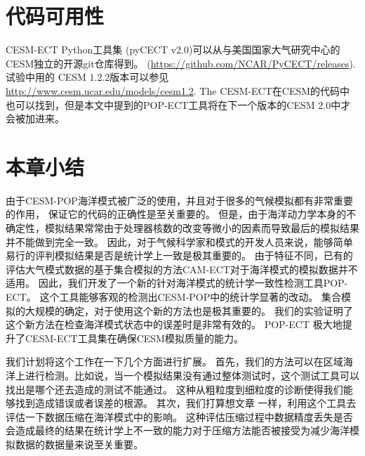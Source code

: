 \section{代码可用性}\label{verify:code}

CESM-ECT Python工具集 (pyCECT v2.0)可以从与美国国家大气研究中心的CESM独立的开源git仓库得到。 (\url{https://github.com/NCAR/PyCECT/releases}).  试验中用的 CESM 1.2.2版本可以参见\url{http://www.cesm.ucar.edu/models/cesm1.2}. The CESM-ECT在CESM的代码中也可以找到，但是本文中提到的POP-ECT工具将在下一个版本的CESM 2.0中才会被加进来。 

\section{本章小结}
\label{verify:Conclusion}

由于CESM-POP海洋模式被广泛的使用，并且对于很多的气候模拟都有非常重要的作用，
保证它的代码的正确性是至关重要的。 
但是，由于海洋动力学本身的不确定性，模拟结果常常由于处理器核数的改变等微小的因素而导致最后的模拟结果并不能做到完全一致。
因此，对于气候科学家和模式的开发人员来说，能够简单易行的评判模拟结果是否是统计学上一致是极其重要的。
由于特征不同，已有的评估大气模式数据的基于集合模拟的方法CAM-ECT对于海洋模式的模拟数据并不适用。 
因此，我们开发了一个新的针对海洋模式的统计学一致性检测工具POP-ECT。
这个工具能够客观的检测出CESM-POP中的统计学显著的改动。 
集合模拟的大规模的确定，对于使用这个新的方法也是极其重要的。
我们的实验证明了这个新方法在检查海洋模式状态中的误差时是非常有效的。 
POP-ECT 极大地提升了CESM-ECT工具集在确保CESM模拟质量的能力。

我们计划将这个工作在一下几个方面进行扩展。 首先，我们的方法可以在区域海洋上进行检测。比如说，当一个模拟结果没有通过整体测试时，这个测试工具可以找出是哪个还去造成的测试不能通过。 
这种从粗粒度到细粒度的诊断使得我们能够找到造成错误或者误差的根源。 
其次，我们打算想文章 一样，利用这个工具去评估一下数据压缩在海洋模式中的影响。
这种评估压缩过程中数据精度丢失是否会造成最终的结果在统计学上不一致的能力对于压缩方法能否被接受为减少海洋模拟数据的数据量来说至关重要。 

